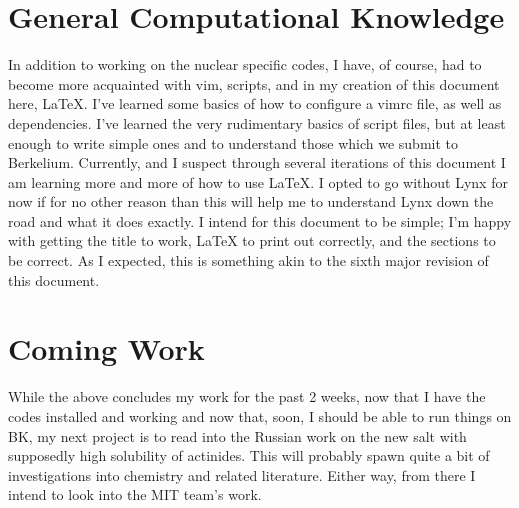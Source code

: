 \documentclass[12pt]{article}
\begin{document}
\section{General Computational Knowledge}
In addition to working on the nuclear specific codes, I have, of course, had to become
more acquainted with vim, scripts, and in my creation of this document here, \LaTeX.
I've learned some basics of how to configure a vimrc file, as well as dependencies. I've
learned the very rudimentary basics of script files, but at least enough to write simple
ones and to understand those which we submit to Berkelium. Currently, and I suspect
through several iterations of this document I am learning more and more of how to use
\LaTeX. I opted to go without Lynx for now if for no other reason than this will help
me to understand Lynx down the road and what it does exactly. I intend for this document
to be simple; I'm happy with getting the title to work, \LaTeX{} to print out correctly, and the
sections to be correct. As I expected, this is something akin to the sixth major revision of this
document.

\section{Coming Work}
While the above concludes my work for the past 2 weeks, now that I have the codes installed
and working and now that, soon, I should be able to run things on BK, my next project
is to read into the Russian work on the new salt with supposedly high solubility of
actinides. This will probably spawn quite a bit of investigations into chemistry and
related literature. Either way, from there I intend to look into the MIT team's work.
\end{document}
